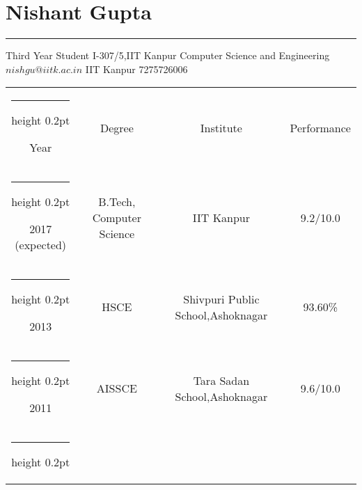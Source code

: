 \documentclass[a4paper]{article}
\author{Nishant Gupta}
\begin{document}
\makeatletter
\newcommand{\thickhline}{%
    \noalign {\ifnum 0=`}\fi \hrule height 1pt
    \futurelet \reserved@a \@xhline
}

\makeatletter
\newcommand{\thinhline}{%
    \noalign {\ifnum 0=`}\fi \hrule height 0.2pt
    \futurelet \reserved@a \@xhline
}

\section*{\textbf\Huge Nishant Gupta}
\hrule
\vspace{2mm}
Third Year Student  \hfill {I-307/5,IIT Kanpur} \newline
Computer Science and Engineering \hfill ${nishgu@iitk.ac.in}$ \newline
IIT Kanpur \hfill  {7275726006} 

\begin{center}
  \begin{tabular}{|c|c|c|c|} 
    \thinhline
    {\centering Year} & {\centering Degree} & {\centering Institute} & {\centering Performance} \\  
    \thinhline
    2017 (expected) & {B.Tech,  Computer Science} & IIT Kanpur  & 9.2/10.0  \\ 
    \thinhline
    2013 & {HSCE} & Shivpuri Public School,Ashoknagar & 			93.60\%	\\
    \thinhline
    2011 & AISSCE & Tara Sadan School,Ashoknagar  & 9.6/10.0   \\
    \thinhline
  \end{tabular}
\end{center}
\end{document}
